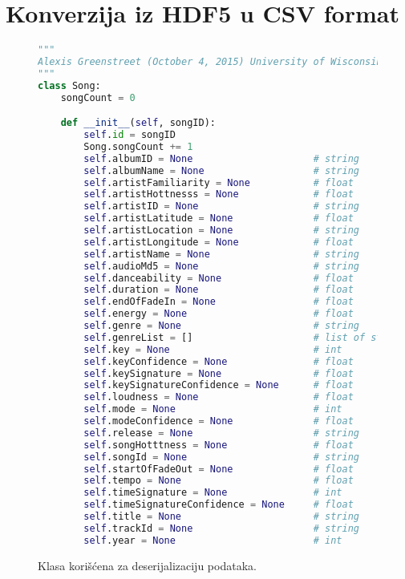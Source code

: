 \section{Konverzija iz HDF5 u CSV format}
\label{sec:DodatakIzvlacenje}

\begin{figure}[H]
\lstset{style=mystyle}
\begin{lstlisting}[language=Python, basicstyle=\footnotesize]
"""
Alexis Greenstreet (October 4, 2015) University of Wisconsin-Madison
"""
class Song:
    songCount = 0

    def __init__(self, songID):
        self.id = songID
        Song.songCount += 1
        self.albumID = None                     # string
        self.albumName = None                   # string
        self.artistFamiliarity = None           # float
        self.artistHottnesss = None             # float
        self.artistID = None                    # string
        self.artistLatitude = None              # float
        self.artistLocation = None              # string
        self.artistLongitude = None             # float
        self.artistName = None                  # string
        self.audioMd5 = None                    # string
        self.danceability = None                # float
        self.duration = None                    # float
        self.endOfFadeIn = None                 # float
        self.energy = None                      # float
        self.genre = None                       # string
        self.genreList = []                     # list of strings
        self.key = None                         # int
        self.keyConfidence = None               # float
        self.keySignature = None                # float
        self.keySignatureConfidence = None      # float
        self.loudness = None                    # float
        self.mode = None                        # int
        self.modeConfidence = None              # float
        self.release = None                     # string
        self.songHotttness = None               # float
        self.songId = None                      # string
        self.startOfFadeOut = None              # float
        self.tempo = None                       # float
        self.timeSignature = None               # int
        self.timeSignatureConfidence = None     # float
        self.title = None                       # string
        self.trackId = None                     # string
        self.year = None                        # int
\end{lstlisting}
\label{code:SongClass}
\caption{Klasa kori\v{s}\'c{}ena za deserijalizaciju podataka.}
\end{figure}

